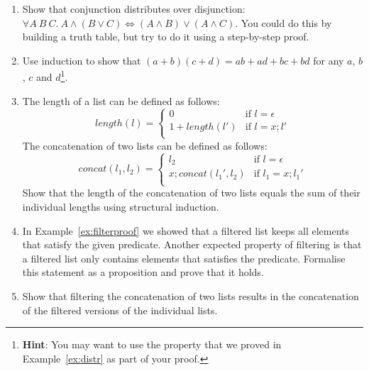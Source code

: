 \documentclass{tufte-handout}
\newcounter{exc:first:proof}
\newcounter{theExerciseCounter}
\begin{document}
\begin{enumerate}
\setcounter{enumi}{\value{theExerciseCounter}}
\setcounter{exc:first:proof}{\value{enumi}}
\item
  Show that conjunction distributes over disjunction:\\
  $\forall A~B~C. ~A \land (B \lor C) \iff (A \land B) \lor (A
  \land C)$. You could do this by building a truth table, but try
  to do it using a step-by-step proof.
\item Use induction to show that
  $(a + b)(c + d) = ab + ad + bc + bd$ for any $a$, $b$, $c$ and
  $d$\footnote{\textbf{Hint}: You may want to use the property
    that we proved in Example~\ref{ex:distr} as part of your
    proof.}.
\item The length of a list can be defined as follows:
  \[
  \mathit{length}(l) =
  \begin{cases}
    0 & \text{if } l = \epsilon\\
    1 + \mathit{length}(l')& \text{if } l = x; l'\\
  \end{cases}
  \]
  The concatenation of two lists can be defined as follows:
  \[
  \mathit{concat}(l_1, l_2) =
  \begin{cases}
    l_2 & \text{if } l = \epsilon\\
    x; \mathit{concat}(l_1', l_2) & \text{if } l_1 = x; l_1'\\
  \end{cases}
  \]
  Show that the length of the concatenation of two lists equals
  the sum of their individual lengths using structural induction.
\item In Example~\ref{ex:filterproof} we showed that a filtered
  list keeps all elements that satisfy the given predicate.
  Another expected property of filtering is that a filtered list
  only contains elements that satisfies the predicate. Formalise
  this statement as a proposition and prove that it holds.
\item Show that filtering the concatenation of two lists results
  in the concatenation of the filtered versions of the individual
  lists.
\end{enumerate}


\end{document}
